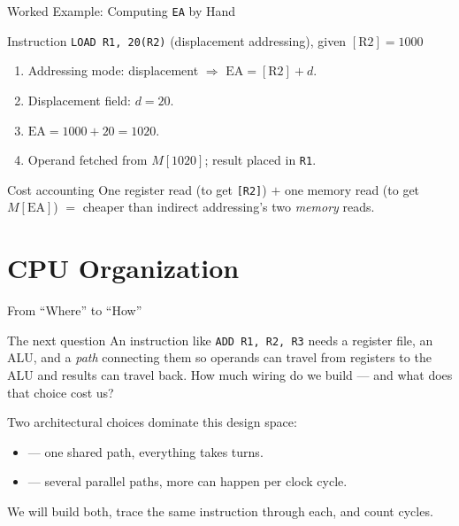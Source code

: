 \documentclass[aspectratio=169]{beamer}
\begin{document}
\begin{frame}{Worked Example: Computing \texttt{EA} by Hand}
  \begin{block}{Instruction}
    \texttt{LOAD R1, 20(R2)} \quad (displacement addressing), given $[\text{R2}] = 1000$
  \end{block}
  \begin{enumerate}
    \item Addressing mode: displacement $\Rightarrow$ $\text{EA} = [\text{R2}] + d$.
    \item Displacement field: $d = 20$.
    \item $\text{EA} = 1000 + 20 = 1020$.
    \item Operand fetched from $M[1020]$; result placed in \texttt{R1}.
  \end{enumerate}
  \begin{exampleblock}{Cost accounting}
    One register read (to get \texttt{[R2]}) $+$ one memory read (to get
    $M[\text{EA}]$) $=$ cheaper than indirect addressing's two \emph{memory} reads.
  \end{exampleblock}
\end{frame}


\section{CPU Organization}

\begin{frame}{From ``Where'' to ``How''}
  \begin{block}{The next question}
    An instruction like \texttt{ADD R1, R2, R3} needs a register file, an ALU, and
    a \emph{path} connecting them so operands can travel from registers to the ALU
    and results can travel back. How much wiring do we build --- and what does
    that choice cost us?
  \end{block}
  Two architectural choices dominate this design space:
  \begin{itemize}
    \item {} --- one shared path, everything takes turns.
    \item {} --- several parallel paths, more can
      happen per clock cycle.
  \end{itemize}
  We will build both, trace the same instruction through each, and count cycles.
\end{frame}
\end{document}
